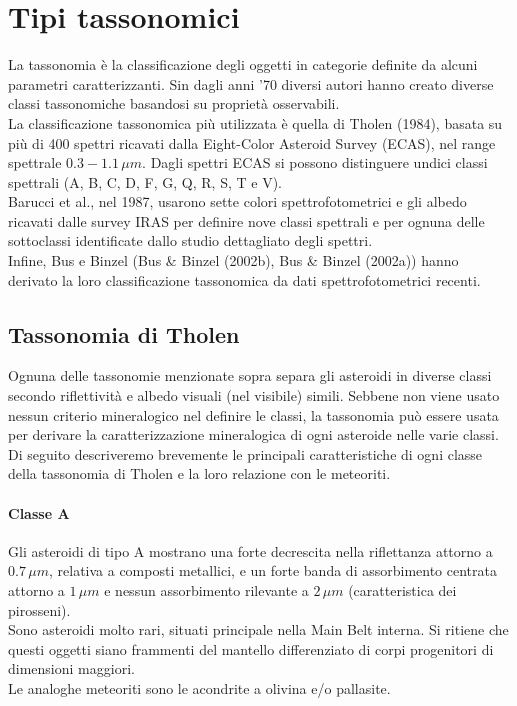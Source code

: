 \documentclass[a4paper,11pt,openright]{book}
\begin{document}
\section{Tipi tassonomici}
La tassonomia è la classificazione degli oggetti in categorie definite da alcuni parametri caratterizzanti. Sin dagli anni '70 diversi autori hanno creato diverse classi tassonomiche basandosi su proprietà osservabili.\\
La classificazione tassonomica più utilizzata è quella di Tholen (1984), basata su più di 400 spettri ricavati dalla Eight-Color Asteroid Survey (ECAS), nel range spettrale $0.3-1.1\,\mu m$. Dagli spettri ECAS si possono distinguere undici classi spettrali (A, B, C, D, F, G, Q, R, S, T e V).\\
Barucci et al., nel 1987, usarono sette colori spettrofotometrici e gli albedo ricavati dalle survey IRAS per definire nove classi spettrali e per ognuna delle sottoclassi identificate dallo studio dettagliato degli spettri.\\
Infine, Bus e Binzel (Bus \& Binzel (2002b), Bus \& Binzel (2002a)) hanno derivato la loro classificazione tassonomica da dati spettrofotometrici recenti.

\subsection{Tassonomia di Tholen}
Ognuna delle tassonomie menzionate sopra separa gli asteroidi in diverse classi secondo riflettività e albedo visuali (nel visibile) simili. Sebbene non viene usato nessun criterio mineralogico nel definire le classi, la tassonomia può essere usata per derivare la caratterizzazione mineralogica di ogni asteroide nelle varie classi.\\
Di seguito descriveremo brevemente le principali caratteristiche di ogni classe della tassonomia di Tholen e la loro relazione con le meteoriti.

\paragraph*{Classe A}
Gli asteroidi di tipo A mostrano una forte decrescita nella riflettanza attorno a $0.7\,\mu m$, relativa a composti metallici, e un forte banda di assorbimento centrata attorno a $1\,\mu m$ e nessun assorbimento rilevante a $2\,\mu m$ (caratteristica dei pirosseni).\\
Sono asteroidi molto rari, situati principale nella Main Belt interna. Si ritiene che questi oggetti siano frammenti del mantello differenziato di corpi progenitori di dimensioni maggiori.\\
Le analoghe meteoriti sono le acondrite a olivina e/o pallasite.
\end{document}
